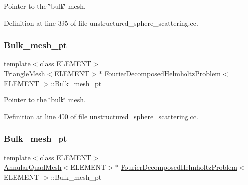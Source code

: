 Pointer to the \char`\"{}bulk\char`\"{} mesh. 



Definition at line 395 of file unstructured\+\_\+sphere\+\_\+scattering.\+cc.

\mbox{\label{classFourierDecomposedHelmholtzProblem_aa7ce7dc89eae3e8a753d3b8f0d71dbc4}} 
\subsubsection{\texorpdfstring{Bulk\+\_\+mesh\+\_\+pt}{Bulk\_mesh\_pt}\hspace{0.1cm}{\footnotesize\ttfamily [2/3]}}
{\footnotesize\ttfamily template$<$class E\+L\+E\+M\+E\+NT$>$ \\
Triangle\+Mesh$<$E\+L\+E\+M\+E\+NT$>$$\ast$ \hyperlink{classFourierDecomposedHelmholtzProblem}{Fourier\+Decomposed\+Helmholtz\+Problem}$<$ E\+L\+E\+M\+E\+NT $>$\+::Bulk\+\_\+mesh\+\_\+pt\hspace{0.3cm}{\ttfamily [private]}}



Pointer to the \char`\"{}bulk\char`\"{} mesh. 



Definition at line 400 of file unstructured\+\_\+sphere\+\_\+scattering.\+cc.

\mbox{\label{classFourierDecomposedHelmholtzProblem_ad5927e4a2156e96c55ebce044c6f9653}} 
\subsubsection{\texorpdfstring{Bulk\+\_\+mesh\+\_\+pt}{Bulk\_mesh\_pt}\hspace{0.1cm}{\footnotesize\ttfamily [3/3]}}
{\footnotesize\ttfamily template$<$class E\+L\+E\+M\+E\+NT$>$ \\
\hyperlink{classAnnularQuadMesh}{Annular\+Quad\+Mesh}$<$E\+L\+E\+M\+E\+NT$>$$\ast$ \hyperlink{classFourierDecomposedHelmholtzProblem}{Fourier\+Decomposed\+Helmholtz\+Problem}$<$ E\+L\+E\+M\+E\+NT $>$\+::Bulk\+\_\+mesh\+\_\+pt\hspace{0.3cm}{\ttfamily [private]}}



